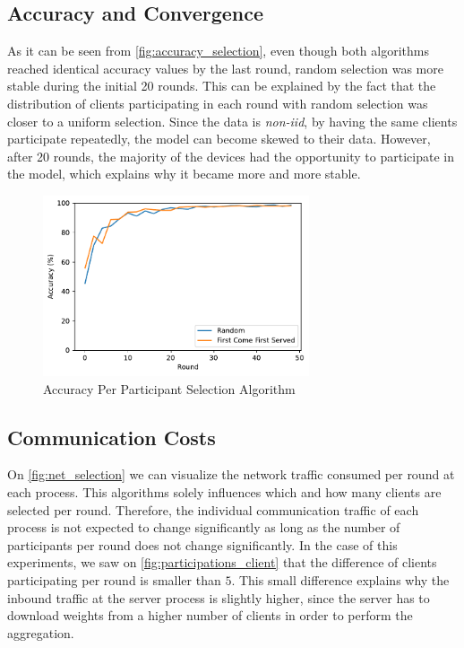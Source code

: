 \subsection{Accuracy and Convergence}

As it can be seen from \autoref{fig:accuracy_selection}, even though both algorithms reached identical accuracy values by the last round, random selection was more stable during the initial 20 rounds. This can be explained by the fact that the distribution of clients participating in each round with random selection was closer to a uniform selection. Since the data is \textit{non-iid}, by having the same clients participate repeatedly, the model can become skewed to their data. However, after 20 rounds, the majority of the devices had the opportunity to participate in the model, which explains why it became more and more stable.

\begin{figure}[!ht]
    \centering
    \centering
    \includegraphics[width=0.7\textwidth]{graphics/selection/accuracy.pdf}
    \caption{Accuracy Per Participant Selection Algorithm}
    \label{fig:accuracy_selection}
\end{figure}

\subsection{Communication Costs}

On \autoref{fig:net_selection} we can visualize the network traffic consumed per round at each process. This algorithms solely influences which and how many clients are selected per round. Therefore, the individual communication traffic of each process is not expected to change significantly as long as the number of participants per round does not change significantly. In the case of this experiments, we saw on \autoref{fig:participations_client} that the difference of clients participating per round is smaller than $5$. This small difference explains why the inbound traffic at the server process is slightly higher, since the server has to download weights from a higher number of clients in order to perform the aggregation.

